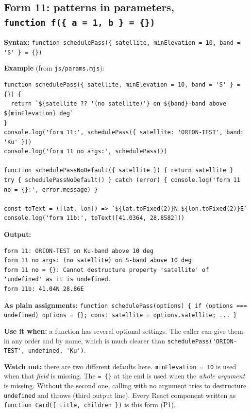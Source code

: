 \hypertarget{form-11-patterns-in-parameters-function-f-a--1-b---}{%
\subsection{\texorpdfstring{Form 11: patterns in parameters, \texttt{function\ f(\{\ a\ =\ 1,\ b\ \}\ =\ \{\})}}{Form 11: patterns in parameters, function f(\{ a = 1, b \} = \{\})}}\label{form-11-patterns-in-parameters-function-f-a--1-b---}}

\textbf{Syntax:} \passthrough{\lstinline!function schedulePass(\{ satellite, minElevation = 10, band = 'S' \} = \{\})!}

\textbf{Example} (from \passthrough{\lstinline!js/params.mjs!}):

\begin{lstlisting}
function schedulePass({ satellite, minElevation = 10, band = 'S' } = {}) {
  return `${satellite ?? '(no satellite)'} on ${band}-band above ${minElevation} deg`
}
console.log('form 11:', schedulePass({ satellite: 'ORION-TEST', band: 'Ku' }))
console.log('form 11 no args:', schedulePass())

function schedulePassNoDefault({ satellite }) { return satellite }
try { schedulePassNoDefault() } catch (error) { console.log('form 11 no = {}:', error.message) }

const toText = ([lat, lon]) => `${lat.toFixed(2)}N ${lon.toFixed(2)}E`
console.log('form 11b:', toText([41.0364, 28.8582]))
\end{lstlisting}

\textbf{Output:}

\begin{lstlisting}
form 11: ORION-TEST on Ku-band above 10 deg
form 11 no args: (no satellite) on S-band above 10 deg
form 11 no = {}: Cannot destructure property 'satellite' of 'undefined' as it is undefined.
form 11b: 41.04N 28.86E
\end{lstlisting}

\textbf{As plain assignments:} \passthrough{\lstinline!function schedulePass(options) \{ if (options === undefined) options = \{\}; const satellite = options.satellite; ... \}!}

\textbf{Use it when:} a function has several optional settings. The caller can give them in any order and by name, which is much clearer than \passthrough{\lstinline!schedulePass('ORION-TEST', undefined, 'Ku')!}.

\textbf{Watch out:} there are two different defaults here. \passthrough{\lstinline!minElevation = 10!} is used when that \emph{field} is missing. The \passthrough{\lstinline!= \{\}!} at the end is used when the \emph{whole argument} is missing. Without the second one, calling with no argument tries to destructure \passthrough{\lstinline!undefined!} and throws (third output line). Every React component written as \passthrough{\lstinline!function Card(\{ title, children \})!} is this form (P1).

